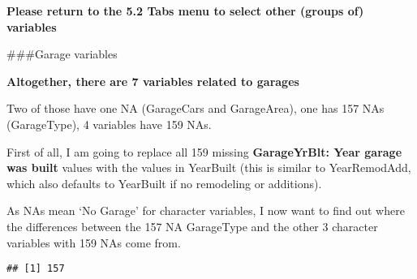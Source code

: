 \documentclass[]{article}
\newenvironment{Shaded}{\begin{snugshade}}{\end{snugshade}}
\newcommand{\CommentTok}[1]{\textcolor[rgb]{0.56,0.35,0.01}{\textit{#1}}}
\newcommand{\KeywordTok}[1]{\textcolor[rgb]{0.13,0.29,0.53}{\textbf{#1}}}
\newcommand{\NormalTok}[1]{#1}
\newcommand{\OperatorTok}[1]{\textcolor[rgb]{0.81,0.36,0.00}{\textbf{#1}}}
\newcommand{\StringTok}[1]{\textcolor[rgb]{0.31,0.60,0.02}{#1}}
\begin{document}
\textbf{Please return to the 5.2 Tabs menu to select other (groups of)
variables}

\#\#\#Garage variables

\textbf{Altogether, there are 7 variables related to garages}

Two of those have one NA (GarageCars and GarageArea), one has 157 NAs
(GarageType), 4 variables have 159 NAs.

First of all, I am going to replace all 159 missing \textbf{GarageYrBlt:
Year garage was built} values with the values in YearBuilt (this is
similar to YearRemodAdd, which also defaults to YearBuilt if no
remodeling or additions).

\begin{Shaded}
\end{Shaded}

As NAs mean `No Garage' for character variables, I now want to find out
where the differences between the 157 NA GarageType and the other 3
character variables with 159 NAs come from.

\begin{Shaded}
\end{Shaded}

\begin{verbatim}
## [1] 157
\end{verbatim}

\begin{Shaded}
\end{Shaded}
\end{document}
